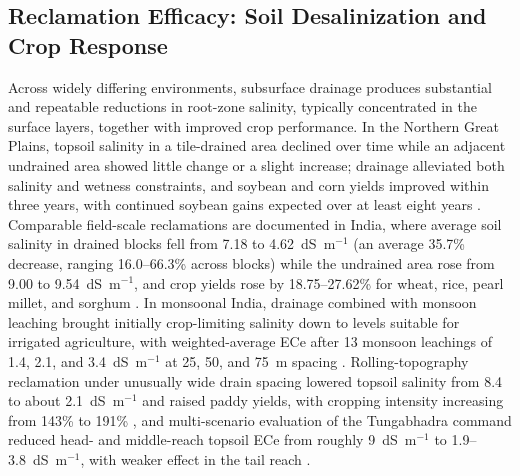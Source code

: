 \documentclass[11pt]{article}
\begin{document}
\subsection{Reclamation Efficacy: Soil Desalinization and Crop Response}

Across widely differing environments, subsurface drainage produces substantial and repeatable reductions in root-zone salinity, typically concentrated in the surface layers, together with improved crop performance. In the Northern Great Plains, topsoil salinity in a tile-drained area declined over time while an adjacent undrained area showed little change or a slight increase; drainage alleviated both salinity and wetness constraints, and soybean and corn yields improved within three years, with continued soybean gains expected over at least eight years \parencite{Derby2024}. Comparable field-scale reclamations are documented in India, where average soil salinity in drained blocks fell from 7.18 to 4.62~dS~m$^{-1}$ (an average 35.7\% decrease, ranging 16.0--66.3\% across blocks) while the undrained area rose from 9.00 to 9.54~dS~m$^{-1}$, and crop yields rose by 18.75--27.62\% for wheat, rice, pearl millet, and sorghum \parencite{Sharma2006}. In monsoonal India, drainage combined with monsoon leaching brought initially crop-limiting salinity down to levels suitable for irrigated agriculture, with weighted-average ECe after 13 monsoon leachings of 1.4, 2.1, and 3.4~dS~m$^{-1}$ at 25, 50, and 75~m spacing \parencite{Sharma2000}. Rolling-topography reclamation under unusually wide drain spacing lowered topsoil salinity from 8.4 to about 2.1~dS~m$^{-1}$ and raised paddy yields, with cropping intensity increasing from 143\% to 191\% \parencite{Manjunatha2004}, and multi-scenario evaluation of the Tungabhadra command reduced head- and middle-reach topsoil ECe from roughly 9~dS~m$^{-1}$ to 1.9--3.8~dS~m$^{-1}$, with weaker effect in the tail reach \parencite{Karegoudar2022}.
\end{document}
